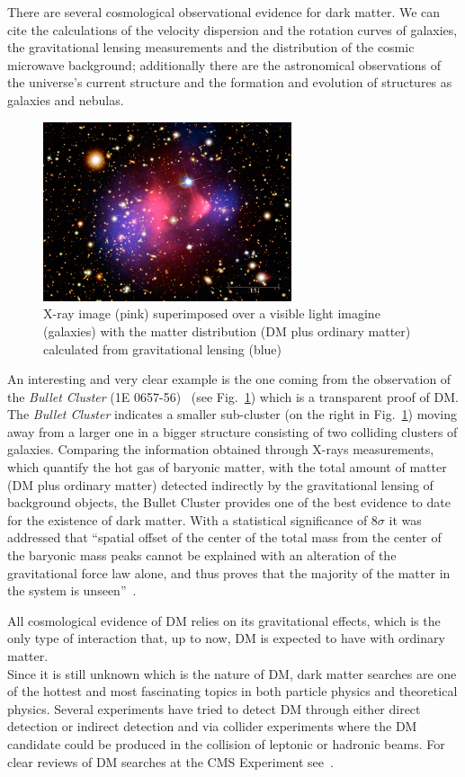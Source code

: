 There are several cosmological observational evidence for dark matter. We can cite the calculations of the velocity dispersion and the rotation curves of galaxies, the gravitational lensing measurements and the distribution of the cosmic microwave background; additionally there are the astronomical observations of the universe's current structure and the formation and evolution of structures as galaxies and nebulas.\\
\begin{figure}[h]
\centering
\includegraphics[width=0.65\textwidth]{Figures/c1/bullet.jpg}
\caption{X-ray image (pink) superimposed over a visible light imagine (galaxies) with the matter distribution (DM plus ordinary matter) calculated from gravitational lensing (blue)~\cite{webpage_bullet}}
\label{fig:bullet}
\end{figure}
An interesting and very clear example is the one coming from the observation of the \emph{Bullet Cluster} (1E 0657-56)~\cite{Clowe_2004} (see Fig.~\ref{fig:bullet}) which is a transparent proof of DM. The \emph{Bullet Cluster} indicates a smaller sub-cluster (on the right in Fig.~\ref{fig:bullet}) moving away from a larger one in a bigger structure consisting of two colliding clusters of galaxies. Comparing the information obtained through X-rays measurements, which quantify the hot gas of baryonic matter, with the total amount of matter (DM plus ordinary matter) detected indirectly by the gravitational lensing of background objects, the Bullet Cluster provides 
one of the best evidence to date for the existence of dark matter. With a statistical significance of 8$\sigma$ it was addressed that ``spatial offset of the center of the total mass from the center of the baryonic mass peaks cannot be explained with an alteration of the gravitational force law alone, and thus proves that the majority of the matter in the system is unseen''~\cite{Clowe_2006}.

All cosmological evidence of DM relies on its gravitational effects, which is the only type of interaction that, up to now, DM is expected to have with ordinary matter.\\
Since it is still unknown which is the nature of DM, dark matter searches are one of the hottest and most fascinating  topics in both particle physics and theoretical physics. Several experiments have tried to detect DM through either direct detection or indirect detection and via collider experiments where the DM candidate could be produced in the collision of leptonic or hadronic beams. For clear reviews of DM searches at the CMS Experiment see~\cite{LOWETTE2016503,Bhawna_Gomber}.

